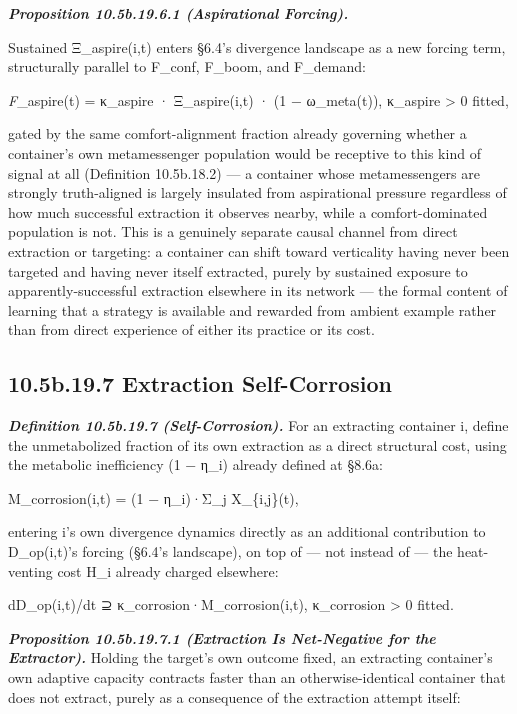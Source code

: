 \documentclass[
]{article}
\begin{document}
\emph{\textbf{Proposition 10.5b.19.6.1 (Aspirational Forcing).}}

Sustained Ξ\_aspire(i,t) enters §6.4's divergence landscape as a new
forcing term, structurally parallel to F\_conf, F\_boom, and F\_demand:

\emph{F}\_aspire(t) = κ\_aspire · Ξ\_aspire(i,t) · (1 − ω\_meta(t)),
κ\_aspire \textgreater{} 0 fitted,

gated by the same comfort-alignment fraction already governing whether a
container's own metamessenger population would be receptive to this kind
of signal at all (Definition 10.5b.18.2) --- a container whose
metamessengers are strongly truth-aligned is largely insulated from
aspirational pressure regardless of how much successful extraction it
observes nearby, while a comfort-dominated population is not. This is a
genuinely separate causal channel from direct extraction or targeting: a
container can shift toward verticality having never been targeted and
having never itself extracted, purely by sustained exposure to
apparently-successful extraction elsewhere in its network --- the formal
content of learning that a strategy is available and rewarded from
ambient example rather than from direct experience of either its
practice or its cost.

\hypertarget{b.19.7-extraction-self-corrosion}{%
\subsection{10.5b.19.7 Extraction
Self-Corrosion}\label{b.19.7-extraction-self-corrosion}}

\emph{\textbf{Definition 10.5b.19.7 (Self-Corrosion).}} For an
extracting container i, define the unmetabolized fraction of its own
extraction as a direct structural cost, using the metabolic inefficiency
(1 − η\_i) already defined at §8.6a:

M\_corrosion(i,t) = (1 − η\_i)·Σ\_j X\_\{i,j\}(t),

entering i's own divergence dynamics directly as an additional
contribution to D\_op(i,t)'s forcing (§6.4's landscape), on top of ---
not instead of --- the heat-venting cost H\_i already charged elsewhere:

dD\_op(i,t)/dt ⊇ κ\_corrosion·M\_corrosion(i,t), κ\_corrosion
\textgreater{} 0 fitted.

\emph{\textbf{Proposition 10.5b.19.7.1 (Extraction Is Net-Negative for
the Extractor).}} Holding the target's own outcome fixed, an extracting
container's own adaptive capacity contracts faster than an
otherwise-identical container that does not extract, purely as a
consequence of the extraction attempt itself:
\end{document}
